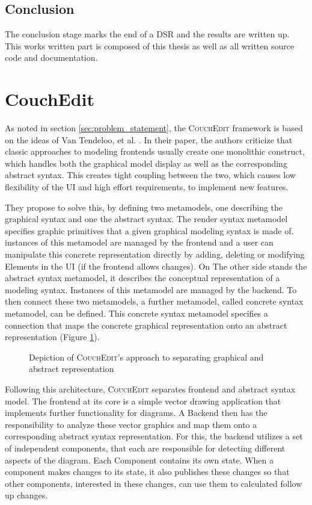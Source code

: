 \subsection{Conclusion}
The conclusion stage marks the end of a DSR and the results are written up. This works written part is composed of this thesis as well as all written source code and documentation.


\section{CouchEdit}
\label{sec:CouchEdit}
As noted in section \ref{sec:problem_statement}, the \textsc{CouchEdit} framework is based on the ideas of Van Tendeloo, et al. \cite{van_tendeloo_concrete_2017}. In their paper, the authors criticize that classic approaches to modeling frontends usually create one monolithic construct, which handles both the graphical model display as well as the corresponding abstract syntax. This creates tight coupling between the two, which causes low flexibility of the UI and high effort requirements, to implement new features. 

They propose to solve this, by defining two metamodels, one describing the graphical syntax and one the abstract syntax. The render syntax metamodel specifies graphic primitives that a given graphical modeling syntax is made of. instances of this metamodel are managed by the frontend and a user can manipulate this concrete representation directly by adding, deleting or modifying Elements in the UI (if the frontend allows changes). On The other side stands the abstract syntax metamodel, it describes the conceptual representation of a modeling syntax. Instances of this metamodel are managed by the backend. To then connect these two metamodels, a further metamodel, called concrete syntax metamodel, can be defined. This concrete syntax metamodel specifies a connection that maps the concrete graphical representation onto an abstract representation (Figure \ref{fig:transmm}). 

\begin{figure}
  \centering
  
  \caption{Depiction of \textsc{CouchEdit}'s approach to separating graphical and abstract representation}
  \label{fig:transmm}
  \end{figure}

Following this architecture, \textsc{CouchEdit} separates frontend and abstract syntax model. The frontend at its core is a simple vector drawing application that implements further functionality for diagrams. A Backend then has the responsibility to analyze these vector graphics and map them onto a corresponding abstract syntax representation. For this, the backend utilizes a set of independent components, that each are responsible for detecting different aspects of the diagram. Each Component contains its own state. When a component makes changes to its state, it also publishes these changes so that other components, interested in these changes, can use them to calculated follow up changes.  

